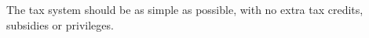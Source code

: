 The tax system should be as simple as possible, with no extra tax credits, subsidies or privileges.
